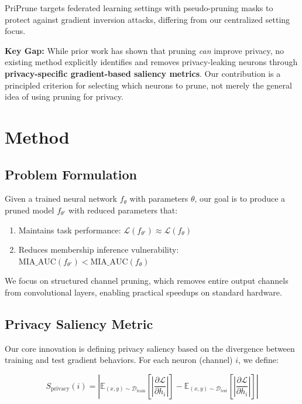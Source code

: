 \documentclass[11pt]{article}
\begin{document}
PriPrune \citep{chu2024priprune} targets federated learning settings with pseudo-pruning masks to protect against gradient inversion attacks, differing from our centralized setting focus.

\textbf{Key Gap:} While prior work has shown that pruning \emph{can} improve privacy, no existing method explicitly identifies and removes privacy-leaking neurons through \textbf{privacy-specific gradient-based saliency metrics}. Our contribution is a principled criterion for selecting which neurons to prune, not merely the general idea of using pruning for privacy.

\section{Method}

\subsection{Problem Formulation}

Given a trained neural network $f_\theta$ with parameters $\theta$, our goal is to produce a pruned model $f_{\theta'}$ with reduced parameters that:
\begin{enumerate}
    \item Maintains task performance: $\mathcal{L}(f_{\theta'}) \approx \mathcal{L}(f_\theta)$
    \item Reduces membership inference vulnerability: $\text{MIA\_AUC}(f_{\theta'}) < \text{MIA\_AUC}(f_\theta)$
\end{enumerate}

We focus on structured channel pruning, which removes entire output channels from convolutional layers, enabling practical speedups on standard hardware.

\subsection{Privacy Saliency Metric}

Our core innovation is defining privacy saliency based on the divergence between training and test gradient behaviors. For each neuron (channel) $i$, we define:

\begin{equation}
S_{\text{privacy}}(i) = \left| \mathbb{E}_{(x,y) \sim \mathcal{D}_{\text{train}}} \left[ \left| \frac{\partial \mathcal{L}}{\partial h_i} \right| \right] - \mathbb{E}_{(x,y) \sim \mathcal{D}_{\text{test}}} \left[ \left| \frac{\partial \mathcal{L}}{\partial h_i} \right| \right] \right|
\end{equation}
\end{document}

